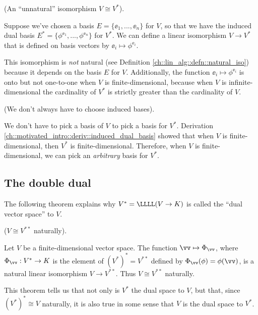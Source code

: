 \begin{remark}
\label{ch::motivated_intro::rmk::unnatural_iso_V_V*}
    (An ``unnatural'' isomorphism $V \cong V^*$).
    
    Suppose we've chosen a basis $E = \{\ee_1, ..., \ee_n\}$ for $V$, so that we have the induced dual basis ${E^* = \{\phi^{\ee_1}, ..., \phi^{\ee_n}\}}$ for $V^*$. We can define a linear isomorphism $V \rightarrow V^*$ that is defined on basis vectors by $\ee_i \mapsto \phi^{\ee_i}$.
    
    This isomorphism is \textit{not} natural (see Definition \ref{ch::lin_alg::defn::natural_iso}) because it depends on the basis $E$ for $V$. Additionally, the function $\ee_i \mapsto \phi^{\ee_i}$ is onto but not one-to-one when $V$ is finite-dimensional, because when $V$ is infinite-dimensional the cardinality of $V^*$ is strictly greater than the cardinality of $V$.    
\end{remark}

\begin{remark}
    (We don't always have to choose induced bases).
    
    We don't have to pick a basis of $V$ to pick a basis for $V^*$. Derivation \ref{ch::motivated_intro::deriv::induced_dual_basis} showed that when $V$ is finite-dimensional, then $V^*$ is finite-dimensional. Therefore, when $V$ is finite-dimensional, we can pick an \textit{arbitrary} basis for $V^*$.
\end{remark}

\subsection*{The double dual}

The following theorem explains why $V^* = \LLLL(V \rightarrow K)$ is called the ``dual vector space'' to $V$.
\begin{theorem}
\label{ch::motivated_intro::thm::V_iso_double_dual}
    ($V \cong V^{**}$ naturally). 
    
    Let $V$ be a finite-dimensional vector space. The function $\vv \mapsto \Phi_\vv$, where $\Phi_\vv:V^* \rightarrow K$ is the element of $(V^*)^* = V^{**}$ defined by $\Phi_\vv(\phi) = \phi(\vv)$, is a natural linear isomorphism $V \rightarrow V^{**}$. Thus $V \cong V^{**}$ naturally.

    This theorem tells us that not only is $V^*$ the dual space to $V$, but that, since $(V^*)^* \cong V$ naturally, it is also true in some sense that $V$ is the dual space to $V^*$.
\end{theorem}

